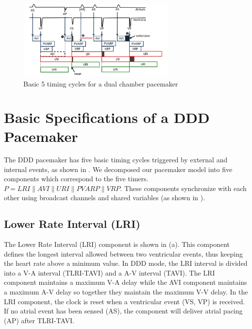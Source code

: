 \begin{figure}[!t]
\center
\includegraphics[width=0.7\textwidth]{figs/PM_timers.pdf}
\caption{Basic 5 timing cycles for a dual chamber pacemaker}
\label{fig:PMtimers}

\end{figure} 
\section{Basic Specifications of a DDD Pacemaker}
The DDD pacemaker has five basic timing cycles triggered by external and internal events, as shown in . We decomposed our pacemaker model into five components which correspond to the five timers. $P=LRI\| AVI\| URI\| PVARP\| VRP$. These components synchronize with each other using broadcast channels and shared variables (as shown in ). 

\subsection{Lower Rate Interval (LRI)}
The Lower Rate Interval (LRI) component is shown in (a). This component defines the longest interval allowed between two ventricular events, thus keeping the heart rate above a minimum value. In DDD mode, the LRI interval is divided into a V-A interval (TLRI-TAVI) and a A-V interval (TAVI). The LRI component maintains a maximum V-A delay while the AVI component maintains a maximum A-V delay so together they maintain the maximum V-V delay. In the LRI component, the clock is reset when a ventricular event \textsf{(VS, VP)} is received. If no atrial event has been sensed \textsf{(AS)}, the component will deliver atrial pacing \textsf{(AP)} after TLRI-TAVI. 

